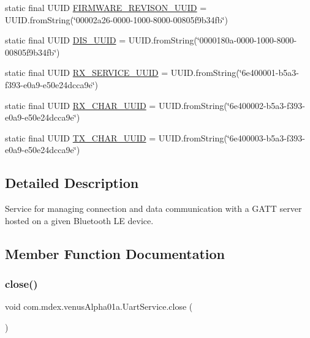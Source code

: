 \begin{DoxyCompactItemize}
static final U\+U\+ID \hyperlink{classcom_1_1mdex_1_1venus_alpha01a_1_1_uart_service_a3d6136559cd5d641da1f6b46dae8933c}{F\+I\+R\+M\+W\+A\+R\+E\+\_\+\+R\+E\+V\+I\+S\+O\+N\+\_\+\+U\+U\+ID} = U\+U\+I\+D.\+from\+String(\char`\"{}00002a26-\/0000-\/1000-\/8000-\/00805f9b34fb\char`\"{})
\item 
static final U\+U\+ID \hyperlink{classcom_1_1mdex_1_1venus_alpha01a_1_1_uart_service_ab301d030c2817448086edfdda58714db}{D\+I\+S\+\_\+\+U\+U\+ID} = U\+U\+I\+D.\+from\+String(\char`\"{}0000180a-\/0000-\/1000-\/8000-\/00805f9b34fb\char`\"{})
\item 
static final U\+U\+ID \hyperlink{classcom_1_1mdex_1_1venus_alpha01a_1_1_uart_service_a7830194fa25ea190bc45196de3d2f597}{R\+X\+\_\+\+S\+E\+R\+V\+I\+C\+E\+\_\+\+U\+U\+ID} = U\+U\+I\+D.\+from\+String(\char`\"{}6e400001-\/b5a3-\/f393-\/e0a9-\/e50e24dcca9e\char`\"{})
\item 
static final U\+U\+ID \hyperlink{classcom_1_1mdex_1_1venus_alpha01a_1_1_uart_service_adcb74025cea6a3cc0b6c4a362217f770}{R\+X\+\_\+\+C\+H\+A\+R\+\_\+\+U\+U\+ID} = U\+U\+I\+D.\+from\+String(\char`\"{}6e400002-\/b5a3-\/f393-\/e0a9-\/e50e24dcca9e\char`\"{})
\item 
static final U\+U\+ID \hyperlink{classcom_1_1mdex_1_1venus_alpha01a_1_1_uart_service_abfb7f0e89ef0bcb54c7c38091d3bb8ba}{T\+X\+\_\+\+C\+H\+A\+R\+\_\+\+U\+U\+ID} = U\+U\+I\+D.\+from\+String(\char`\"{}6e400003-\/b5a3-\/f393-\/e0a9-\/e50e24dcca9e\char`\"{})
\end{DoxyCompactItemize}


\subsection{Detailed Description}
Service for managing connection and data communication with a G\+A\+TT server hosted on a given Bluetooth LE device. 

\subsection{Member Function Documentation}
\mbox{\label{classcom_1_1mdex_1_1venus_alpha01a_1_1_uart_service_ae7041fe20f64a554c2685cdc4c7d69b5}} 
\subsubsection{\texorpdfstring{close()}{close()}}
{\footnotesize\ttfamily void com.\+mdex.\+venus\+Alpha01a.\+Uart\+Service.\+close (\begin{DoxyParamCaption}{ }\end{DoxyParamCaption})}

